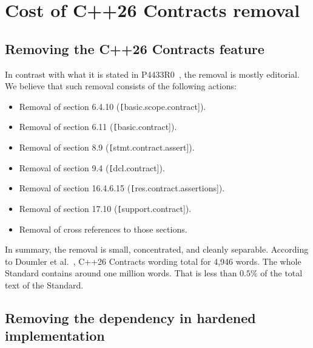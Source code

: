 \section{Cost of C++26 Contracts removal}

\subsection{Removing the C++26 Contracts feature}

In contrast with what it is stated in P4433R0~\cite{p4433r0}, the removal is mostly 
editorial.
We believe that such removal consists of the following actions:

\begin{itemize}

\item Removal of section 6.4.10 (\texttt[basic.scope.contract]).

\item Removal of section 6.11 (\texttt[basic.contract]).

\item Removal of section 8.9 (\texttt[stmt.contract.assert]).

\item Removal of section 9.4 (\texttt[dcl.contract]).

\item Removal of section 16.4.6.15 (\texttt[res.contract.assertions]).

\item Removal of section 17.10 (\texttt[support.contract]).

\item Removal of cross references to those sections.

\end{itemize}

\vspace{1em}
\begin{tcolorbox}[
  colback=blue!8!white,
  colframe=blue,
  title={\textbf{Cost of removing C++26 Contracts}},
  breakable,
  width=\textwidth,
  boxrule=0.5pt
  ]
In summary, the removal is small, concentrated, and cleanly separable. According
to Doumler et al.~\cite{p4433r0}, C++26 Contracts wording total for 4,946 words. The
whole Standard contains around one million words. That is less than $0.5\%$ of
the total text of the Standard.
\end{tcolorbox}

\subsection{Removing the dependency in hardened implementation}

